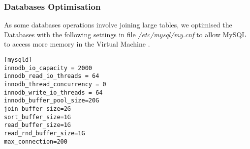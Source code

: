 \subsubsection{Databases Optimisation}
\par As some databases operations involve joining large tables, we optimised the Databases with the following settings in file \textit{/etc/mysql/my.cnf} to allow MySQL to access more memory in the Virtual Machine\cite{setting_innodb_buffer_pool_size} \cite{innodb_buffer}.

\begin{verbatim}
[mysqld]
innodb_io_capacity = 2000
innodb_read_io_threads = 64
innodb_thread_concurrency = 0
innodb_write_io_threads = 64
innodb_buffer_pool_size=20G
join_buffer_size=2G
sort_buffer_size=1G
read_buffer_size=1G
read_rnd_buffer_size=1G
max_connection=200
\end{verbatim}



